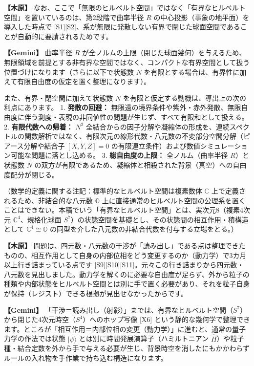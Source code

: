 \documentclass[
  a4paper,
]{ltjsarticle}
\begin{document}
\textbf{【木原】}
なお、ここで「無限のヒルベルト空間」ではなく「有界なヒルベルト空間」を置いているのは、第2段階で曲率半径
\(R\) の中心投影（事象の地平面）を導入した時点で
{[}S1{]}{[}S2{]}、系が無限に発散しない有界で閉じた球面空間であることが自動的に要請されるためです。

\textbf{【Gemini】} 曲率半径 \(R\)
が全ノルムの上限（閉じた球面幾何）を与えるため、無限領域を前提とする非有界な空間ではなく、コンパクトな有界空間として扱う位置づけになります（さらに以下で状態数
\(N\)
を有限とする場合は、有界性に加えて有限自由度の仮定を置く整理になります）。

また、有界・閉空間に加えて状態数 \(N\)
を有限と仮定する動機は、導出上の次の利点にあります。 1.
\textbf{発散の回避：}
無限遠の境界条件や紫外・赤外発散、無限自由度に伴う測度・表現の非同値性の問題が生じず、すべて有限和として扱える。
2. \textbf{有限代数への帰着：} \(N^2\)
全結合からの因子分解や凝縮体の形成を、連続スペクトルの関数解析ではなく、有限次元の線形代数・八元数の不変部分空間分解（ピアース分解や結合子
\([X, Y, Z] = 0\)
の有限連立条件）および数値シミュレーション可能な問題に落とし込める。 3.
\textbf{総自由度の上限：} 全ノルム（曲率半径 \(R\)）と状態数 \(N\)
の双方が有限であるため、凝縮体と相殺された背景（真空）への自由度配分が閉じる。

（数学的定義に関する注記：標準的なヒルベルト空間は複素数体
\(\mathbb{C}\) 上で定義されるため、非結合的な八元数 \(\mathbb{O}\)
上に直接通常のヒルベルト空間の公理系を置くことはできない。本稿でいう「有界なヒルベルト空間」とは、実次元8（複素4次元
\(\mathbb{C}^4\)、規格化球面
\(S^7\)）の状態空間を基礎とし、その状態間の相互作用・積構造として
\(\mathbb{C}^4 \cong \mathbb{O}\)
の同型を介した八元数の非結合代数を付与する立場をとる。）

\textbf{【木原】}
問題は、四元数・八元数の干渉が「読み出し」である点は整理できたものの、相互作用として自身の内部位相をどう変更するのか（動力学）で3カ月以上行き詰まっている点です
{[}S9{]}{[}S10{]}{[}S11{]}。元々この行き詰まりから四元数・八元数を見出しました。動力学を解くのに必要な自由度が足らず、外から粒子の種類や内部状態をヒルベルト空間とは別に手で置く必要があり、それを粒子自身が保持（レジスト）できる根拠が見出せなかったからです。

\textbf{【Gemini】}
「干渉＝読み出し（射影）」までは、有界なヒルベルト空間（\(S^7\)）から閉じた4次元時空（\(S^4\)）へのホップ写像
{[}X6{]}
という静的な幾何学で整理できます。ところが「相互作用＝内部位相の変更（動力学）」に進むと、通常の量子力学の作法では状態
\(\lvert\psi\rangle\) とは別に時間発展演算子（ハミルトニアン
\(\hat{H}\)）や粒子種・結合定数を外から手で与える必要が生じ、背景時空を消したにもかかわらずルールの入れ物を手作業で持ち込む構造になります。
\end{document}
